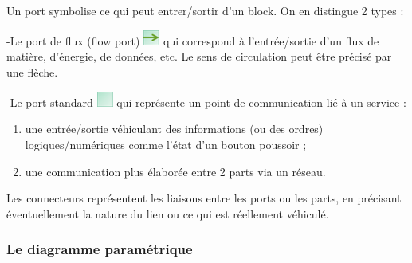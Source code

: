 \documentclass[12pt,a4paper]{report}
\begin{document}
\noindent \begin{flushleft}
	
	
	\noindent Un port symbolise ce qui peut entrer/sortir d'un block. On en distingue 2 types :
	
	\noindent 
	
	\noindent -Le port de flux (flow port) \includegraphics*[bb=0 0 0.21in 0.20in, width=0.21in, height=0.20in, keepaspectratio=false]{image14} qui correspond \`{a} l'entr\'{e}e/sortie d'un flux de mati\`{e}re, d'\'{e}nergie, de donn\'{e}es, etc. Le sens de circulation peut \^{e}tre pr\'{e}cis\'{e} par une fl\`{e}che.
	
	\noindent -Le port standard  \includegraphics*[bb=0 0 0.21in 0.20in, width=0.21in, height=0.20in, keepaspectratio=false]{image15} qui repr\'{e}sente un point de communication li\'{e} \`{a} un service :
\end{flushleft}

\begin{enumerate}
	\item  une entr\'{e}e/sortie v\'{e}hiculant des informations (ou des ordres) logiques/num\'{e}riques comme l'\'{e}tat d'un bouton poussoir ;
	
	\item  une communication plus \'{e}labor\'{e}e entre 2 parts via un r\'{e}seau.
\end{enumerate}

\noindent \begin{flushleft}
	Les connecteurs repr\'{e}sentent les liaisons entre les ports ou les parts, en pr\'{e}cisant \'{e}ventuellement la nature du lien ou ce qui est r\'{e}ellement v\'{e}hicul\'{e}.
\end{flushleft}


\subsubsection{ Le diagramme param\'{e}trique}
\end{document}
